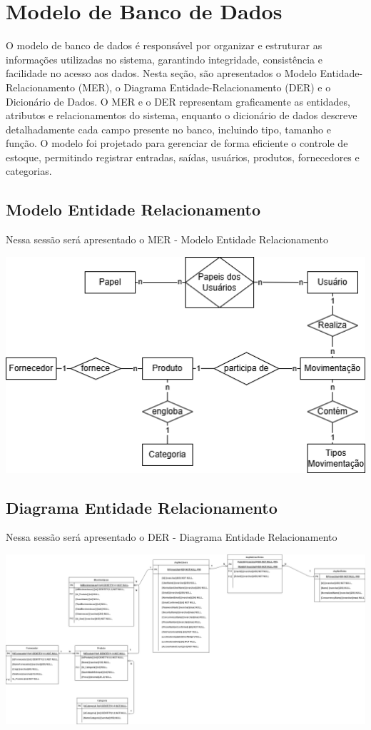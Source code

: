 \documentclass[
	12pt,				%
	openany,			%
	twoside,			%
	a4paper,			%
	english,			%
	brazil				%
	]{abntex2}
\begin{document}
\section{Modelo de Banco de Dados}

O modelo de banco de dados é responsável por organizar e estruturar as informações utilizadas no sistema, garantindo integridade, consistência e facilidade no acesso aos dados. Nesta seção, são apresentados o Modelo Entidade-Relacionamento (MER), o Diagrama Entidade-Relacionamento (DER) e o Dicionário de Dados. O MER e o DER representam graficamente as entidades, atributos e relacionamentos do sistema, enquanto o dicionário de dados descreve detalhadamente cada campo presente no banco, incluindo tipo, tamanho e função. O modelo foi projetado para gerenciar de forma eficiente o controle de estoque, permitindo registrar entradas, saídas, usuários, produtos, fornecedores e categorias.

\subsection{Modelo Entidade Relacionamento}
Nessa sessão será apresentado o MER - Modelo Entidade Relacionamento

\includegraphics[width=1.0\textwidth]{Figuras/MERestoque.png}


\subsection{Diagrama Entidade Relacionamento}
Nessa sessão será apresentado o DER - Diagrama Entidade Relacionamento

\includegraphics[width=1.0\textwidth]{Figuras/DERestoque.png}
\end{document}
